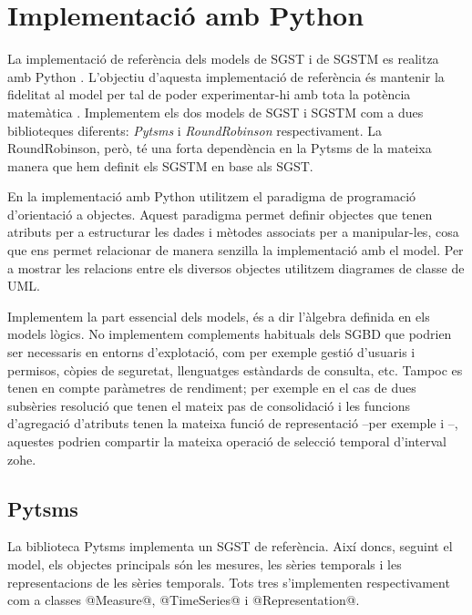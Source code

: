

\chapter{Implementació amb Python}



La implementació de referència dels models de \gls{SGST} i de \gls{SGSTM}
es realitza amb Python \parencite{python:doc2}. L'objectiu d'aquesta
implementació de referència és mantenir la fidelitat al model per tal
de poder experimentar-hi amb tota la potència matemàtica .
Implementem els dos models de \gls{SGST} i \gls{SGSTM} com a dues biblioteques
diferents: \emph{Pytsms} i \emph{RoundRobinson} respectivament. La
RoundRobinson, però, té una forta dependència en la
Pytsms de la mateixa manera que hem definit els \gls{SGSTM} en base
als \gls{SGST}.


En la implementació amb Python utilitzem el paradigma de programació
d'orientació a objectes. Aquest paradigma permet definir objectes que
tenen atributs per a estructurar les dades i mètodes associats per a
manipular-les, cosa que ens permet relacionar de manera senzilla la
implementació amb el model.  Per a mostrar les relacions entre els
diversos objectes utilitzem diagrames de classe de \gls{UML}.




Implementem la part essencial dels models, és a dir l'àlgebra definida
en els models lògics. No implementem complements habituals dels
\gls{SGBD} que podrien ser necessaris en entorns d'explotació, com per
exemple gestió d'usuaris i permisos, còpies de seguretat, llenguatges
estàndards de consulta, etc.  Tampoc es tenen en compte paràmetres de
rendiment; per exemple en el cas de dues subsèries resolució que tenen
el mateix pas de consolidació i les funcions d'agregació d'atributs
tenen la mateixa funció de representació --per exemple
 i --,
aquestes podrien compartir la mateixa operació de
selecció temporal d'interval \gls{zohe}.



\section{Pytsms}

La biblioteca Pytsms implementa un \gls{SGST} de referència. Així
doncs, seguint el model, els objectes principals són les mesures, les
sèries temporals i les representacions de les sèries temporals. Tots
tres s'implementen respectivament com a classes @Measure@,
@TimeSeries@ i @Representation@.


